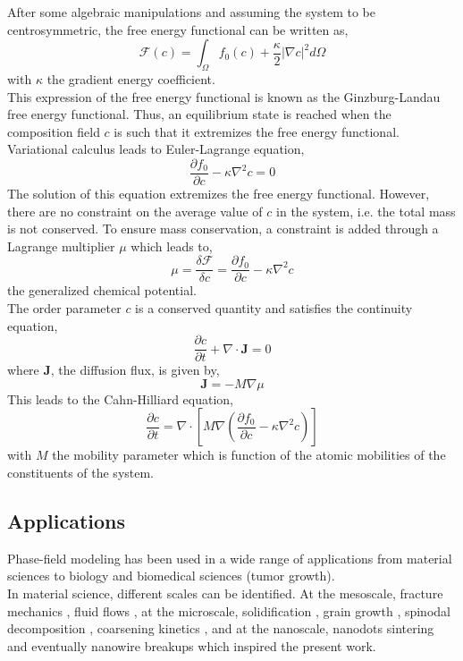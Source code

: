     After some algebraic manipulations and assuming the system to be centrosymmetric, the free energy functional can be written as,
    \begin{equation}
        \mathcal{F}(c) =\int_\Omega f_0(c) + \frac{\kappa}{2} |\nabla c|^2 d\Omega
    \end{equation}
    with $\kappa$ the gradient energy coefficient.\\
    This expression of the free energy functional is known as the Ginzburg-Landau\cite{} free energy functional. Thus, an equilibrium state is reached when the composition field $c$ is such that it extremizes the free energy functional. Variational calculus leads to Euler-Lagrange equation,
    \begin{equation}
        \frac{\partial f_0}{\partial c} - \kappa \nabla^2 c = 0
    \end{equation}
    The solution of this equation extremizes the free energy functional. However, there are no constraint on the average value of $c$ in the system, i.e. the total mass is not conserved. To ensure mass conservation, a constraint is added through a Lagrange multiplier $\mu$ which leads to,
    \begin{equation}
        \mu = \frac{\delta \mathcal{F}}{\delta c} = \frac{\partial f_0}{\partial c} - \kappa \nabla^2 c
    \end{equation}
    the generalized chemical potential.\\
    The order parameter $c$ is a conserved quantity and satisfies the continuity equation,
    \begin{equation}
        \frac{\partial c}{\partial t} + \nabla \cdot \mathbf{J} = 0
    \end{equation}
    where $\mathbf{J}$, the diffusion flux, is given by,
    \begin{equation}
        \mathbf{J} = -M \nabla \mu
    \end{equation}
    This leads to the Cahn-Hilliard equation,
    \begin{equation}
        \frac{\partial c}{\partial t} = \nabla \cdot \left[ M \nabla \left( \frac{\partial f_0}{\partial c} - \kappa \nabla^2 c \right) \right]
    \end{equation}
    with $M$ the mobility parameter which is function of the atomic mobilities of the constituents of the system.
\subsection{Applications}
    Phase-field modeling has been used in a wide range of applications from material sciences to biology and biomedical sciences (tumor growth).\\
    In material science, different scales can be identified. At the mesoscale, fracture mechanics \cite{}, fluid flows \cite{}, at the microscale, solidification \cite{}, grain growth \cite{}, spinodal decomposition \cite{}, coarsening kinetics \cite{}, and at the nanoscale, nanodots sintering \cite{sintering} and eventually nanowire breakups \cite{RoyVarmaGururajan2021} which inspired the present work.